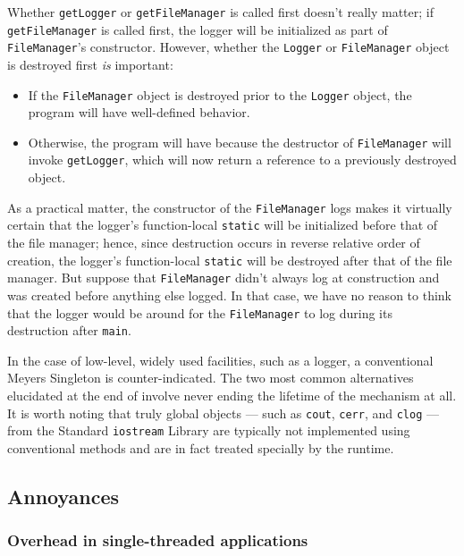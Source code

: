 \noindent Whether \lstinline!getLogger! or \lstinline!getFileManager! is called first
doesn't really matter; if \lstinline!getFileManager! is called first, the
logger will be initialized as part of \lstinline!FileManager!'s
constructor. However, whether the \lstinline!Logger! or
\lstinline!FileManager! object is destroyed first \emph{is} important:

\begin{itemize}
\item{If the \lstinline!FileManager! object is destroyed prior to the \lstinline!Logger! object, the program will have well-defined behavior.}
\item{Otherwise, the program will have  because the destructor of \lstinline!FileManager! will invoke \lstinline!getLogger!, which will now return a reference to a previously destroyed object.}
\end{itemize}

As a practical matter, the constructor of the \lstinline!FileManager! logs
makes it virtually certain that the logger's function-local
\lstinline!static! will be initialized before that of the file manager;
hence, since destruction occurs in reverse relative order of creation,
the logger's function-local \lstinline!static! will be destroyed after that
of the file manager. But suppose that \lstinline!FileManager! didn't always
log at construction and was created before anything else logged. In that
case, we have no reason to think that the logger would be around for the
\lstinline!FileManager! to log during its destruction after \lstinline!main!.

In the case of low-level, widely used facilities, such as a logger, a
conventional Meyers Singleton is counter-indicated. The two most common
alternatives elucidated at the end of  involve never ending the lifetime of
the mechanism at all. It is worth noting that truly global objects ---
such as \lstinline!cout!, \lstinline!cerr!, and \lstinline!clog! --- from the
Standard \lstinline!iostream! Library are typically not implemented using
conventional methods and are in fact treated specially by the runtime.

\subsection[Annoyances]{Annoyances}\label{annoyances}

\subsubsection[Overhead in single-threaded applications]{Overhead in single-threaded applications}\label{overhead-in-single-threaded-applications}

